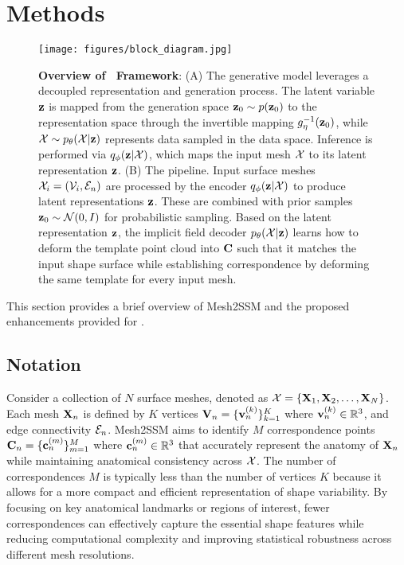 \section{Methods}\label{methods}
\begin{figure}
    \centering
    \texttt{[image: figures/block\_diagram.jpg]}
    \vspace{-15mm}
    \caption{\textbf{Overview of \model~Framework}: (A) The generative model leverages a decoupled representation and generation process. The latent variable \(\mathbf{z}\) is mapped from the generation space \(\mathbf{z}_0 \sim p(\mathbf{z}_0) \) to the representation space through the invertible mapping \( g_\eta^{-1}(\mathbf{z}_0) \), while \(\mathcal{X} \sim p_\theta(\mathcal{X}|\mathbf{z}) \) represents data sampled in the data space. Inference is performed via \( q_\phi(\mathbf{z}|\mathcal{X}) \), which maps the input mesh \(\mathcal{X}\) to its latent representation \(\mathbf{z}\). (B) The \model pipeline. Input surface meshes \( \mathcal{X}_i = (\mathcal{V}_i, \mathcal{E}_n) \) are processed by the encoder \( q_\phi(\mathbf{z}|\mathcal{X}) \) to produce latent representations \(\mathbf{z} \). These are combined with prior samples \(\mathbf{z}_0 \sim \mathcal{N}(0, I) \) for probabilistic sampling. Based on the latent representation \(\mathbf{z}\), the implicit field decoder \( p_\theta(\mathcal{X}|\mathbf{z})\) learns how to deform the template point cloud into \(\mathbf{C}\) such that it matches the input shape surface while establishing correspondence by deforming the same template for every input mesh.}
    \vspace{-3mm}
    \label{fig:model_arch}
\end{figure}
This section provides a brief overview of Mesh2SSM and the proposed enhancements provided for \model. 

\subsection{Notation}\label{notations}
Consider a collection of \(N\) surface meshes, denoted as \(\mathcal{X} = \{\mathbf{X}_1, \mathbf{X}_2, \dots, \mathbf{X}_N\}\). Each mesh \(\mathbf{X}_n\) is defined by \(K\) vertices \(\mathbf{V}_n = \{\mathbf{v}_{n}^{(k)}\}_{k=1}^K \) where \(\mathbf{v}_n^{(k)} \in \mathbb{R}^3\), and edge connectivity \(\mathcal{E}_n\). Mesh2SSM aims to identify \(M\) correspondence points \(\mathbf{C}_n = \{\mathbf{c}_{n}^{(m)}\}_{m=1}^M \) where \(\mathbf{c}_{n}^{(m)} \in \mathbb{R}^3\) that accurately represent the anatomy of \(\mathbf{X}_n\) while maintaining anatomical consistency across \(\mathcal{X}\). 
The number of correspondences \(M\) is typically less than the number of vertices \(K\) because it allows for a more compact and efficient representation of shape variability. By focusing on key anatomical landmarks or regions of interest, fewer correspondences can effectively capture the essential shape features while reducing computational complexity and improving statistical robustness across different mesh resolutions.

